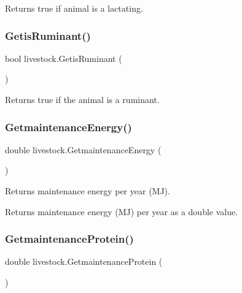 Returns true if animal is a lactating. 

\mbox{\label{classlivestock_ab8e1f9dd415c9fca45007fe6b87f02ec}} 
\subsubsection{\texorpdfstring{GetisRuminant()}{GetisRuminant()}}
{\footnotesize\ttfamily bool livestock.\+Getis\+Ruminant (\begin{DoxyParamCaption}{ }\end{DoxyParamCaption})\hspace{0.3cm}{\ttfamily [inline]}}



Returns true if the animal is a ruminant. 

\mbox{\label{classlivestock_a95f8f38c956fbaa68522def23741e9c3}} 
\subsubsection{\texorpdfstring{GetmaintenanceEnergy()}{GetmaintenanceEnergy()}}
{\footnotesize\ttfamily double livestock.\+Getmaintenance\+Energy (\begin{DoxyParamCaption}{ }\end{DoxyParamCaption})\hspace{0.3cm}{\ttfamily [inline]}}



Returns maintenance energy per year (MJ). 

\begin{DoxyReturn}{Returns}
maintenance energy (MJ) per year as a double value. 
\end{DoxyReturn}
\mbox{\label{classlivestock_ac5ae828f82a2dd6ec59eca8c6a56d774}} 
\subsubsection{\texorpdfstring{GetmaintenanceProtein()}{GetmaintenanceProtein()}}
{\footnotesize\ttfamily double livestock.\+Getmaintenance\+Protein (\begin{DoxyParamCaption}{ }\end{DoxyParamCaption})\hspace{0.3cm}{\ttfamily [inline]}}




